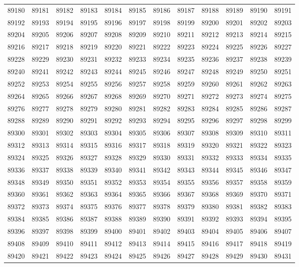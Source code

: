 \begin{center}
\begin{longtable}{llllllllllll}
89180 &89181 &89182 &89183 &89184 &89185 &89186 &89187 &89188 &89189 &89190 &89191 \\
89192 &89193 &89194 &89195 &89196 &89197 &89198 &89199 &89200 &89201 &89202 &89203 \\
89204 &89205 &89206 &89207 &89208 &89209 &89210 &89211 &89212 &89213 &89214 &89215 \\
89216 &89217 &89218 &89219 &89220 &89221 &89222 &89223 &89224 &89225 &89226 &89227 \\
89228 &89229 &89230 &89231 &89232 &89233 &89234 &89235 &89236 &89237 &89238 &89239 \\
89240 &89241 &89242 &89243 &89244 &89245 &89246 &89247 &89248 &89249 &89250 &89251 \\
89252 &89253 &89254 &89255 &89256 &89257 &89258 &89259 &89260 &89261 &89262 &89263 \\
89264 &89265 &89266 &89267 &89268 &89269 &89270 &89271 &89272 &89273 &89274 &89275 \\
89276 &89277 &89278 &89279 &89280 &89281 &89282 &89283 &89284 &89285 &89286 &89287 \\
89288 &89289 &89290 &89291 &89292 &89293 &89294 &89295 &89296 &89297 &89298 &89299 \\
89300 &89301 &89302 &89303 &89304 &89305 &89306 &89307 &89308 &89309 &89310 &89311 \\
89312 &89313 &89314 &89315 &89316 &89317 &89318 &89319 &89320 &89321 &89322 &89323 \\
89324 &89325 &89326 &89327 &89328 &89329 &89330 &89331 &89332 &89333 &89334 &89335 \\
89336 &89337 &89338 &89339 &89340 &89341 &89342 &89343 &89344 &89345 &89346 &89347 \\
89348 &89349 &89350 &89351 &89352 &89353 &89354 &89355 &89356 &89357 &89358 &89359 \\
89360 &89361 &89362 &89363 &89364 &89365 &89366 &89367 &89368 &89369 &89370 &89371 \\
89372 &89373 &89374 &89375 &89376 &89377 &89378 &89379 &89380 &89381 &89382 &89383 \\
89384 &89385 &89386 &89387 &89388 &89389 &89390 &89391 &89392 &89393 &89394 &89395 \\
89396 &89397 &89398 &89399 &89400 &89401 &89402 &89403 &89404 &89405 &89406 &89407 \\
89408 &89409 &89410 &89411 &89412 &89413 &89414 &89415 &89416 &89417 &89418 &89419 \\
89420 &89421 &89422 &89423 &89424 &89425 &89426 &89427 &89428 &89429 &89430 &89431 \\

\end{longtable}
\end{center}
